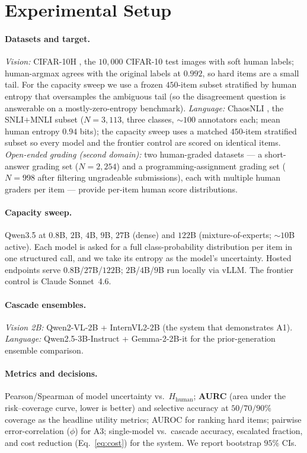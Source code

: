 \documentclass[letterpaper]{article} %
\begin{document}
\section{Experimental Setup}

\paragraph{Datasets and target.}
\emph{Vision:} CIFAR-10H \citep{peterson2019human}, the $10{,}000$ CIFAR-10
\citep{krizhevsky2009learning} test images with soft human labels; human-argmax
agrees with the original labels at $0.992$, so hard items are a small tail. For the
capacity sweep we use a frozen $450$-item subset stratified by human entropy that
oversamples the ambiguous tail (so the disagreement question is answerable on a
mostly-zero-entropy benchmark).
\emph{Language:} ChaosNLI \citep{nie2020chaosnli}, the SNLI$+$MNLI subset
($N{=}3{,}113$, three classes, ${\sim}100$ annotators each; mean human entropy
$0.94$ bits); the capacity sweep uses a matched $450$-item stratified subset so
every model and the frontier control are scored on identical items.
\emph{Open-ended grading (second domain):} two human-graded datasets --- a
short-answer grading set ($N{=}2{,}254$) and a programming-assignment grading set
($N{=}998$ after filtering ungradeable submissions), each with multiple human
graders per item --- provide per-item human score distributions.

\paragraph{Capacity sweep.}
Qwen3.5 at $0.8$B, $2$B, $4$B, $9$B, $27$B (dense) and $122$B
(mixture-of-experts; $\sim\!10$B active). Each model is asked for a full
class-probability distribution per item in one structured call, and we take its
entropy as the model's uncertainty. Hosted endpoints serve
$0.8$B/$27$B/$122$B; $2$B/$4$B/$9$B run locally via vLLM. The frontier control is
Claude Sonnet~4.6.

\paragraph{Cascade ensembles.}
\emph{Vision 2B:} Qwen2-VL-2B + InternVL2-2B (the system that demonstrates A1).
\emph{Language:} Qwen2.5-3B-Instruct + Gemma-2-2B-it for the prior-generation
ensemble comparison.

\paragraph{Metrics and decisions.}
Pearson/Spearman of model uncertainty vs.\ $H_{\text{human}}$; \textbf{AURC}
(area under the risk--coverage curve, lower is better) and selective accuracy at
$50/70/90\%$ coverage as the headline utility metrics; AUROC for ranking hard
items; pairwise error-correlation ($\phi$) for A3; single-model vs.\ cascade
accuracy, escalated fraction, and cost reduction (Eq.~\ref{eq:cost}) for the
system. We report bootstrap $95\%$ CIs.
\end{document}
